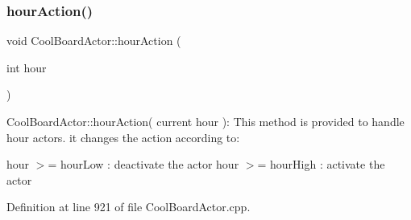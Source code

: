 \subsubsection{\texorpdfstring{hour\+Action()}{hourAction()}}
{\footnotesize\ttfamily void Cool\+Board\+Actor\+::hour\+Action (\begin{DoxyParamCaption}\item[{int}]{hour }\end{DoxyParamCaption})}

Cool\+Board\+Actor\+::hour\+Action( current hour )\+: This method is provided to handle hour actors. it changes the action according to\+:

hour $>$= hour\+Low \+: deactivate the actor hour $>$= hour\+High \+: activate the actor 

Definition at line 921 of file Cool\+Board\+Actor.\+cpp.


